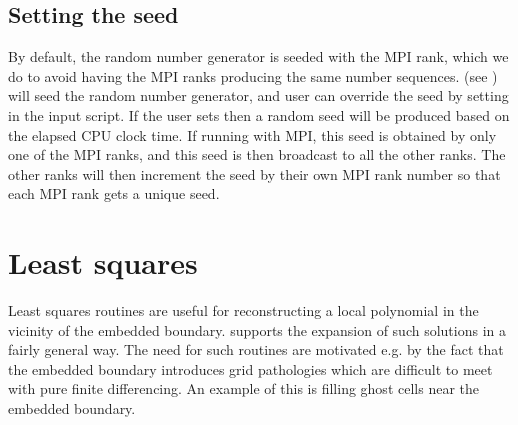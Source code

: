 \documentclass[letterpaper,10pt,english]{sphinxmanual}
\begin{document}
\subsection{Setting the seed}
\label{\detokenize{Utilities/RandomNumbers:setting-the-seed}}
\sphinxAtStartPar
By default, the random number generator is seeded with the MPI rank, which we do to avoid having the MPI ranks producing the same number sequences.
 (see {\hyperref[\detokenize{Source/Driver:chap-driver}]{}}) will seed the random number generator, and user can override the seed by setting  in the input script.
If the user sets  then a random seed will be produced based on the elapsed CPU clock time.
If running with MPI, this seed is obtained by only one of the MPI ranks, and this seed is then broadcast to all the other ranks.
The other ranks will then increment the seed by their own MPI rank number so that each MPI rank gets a unique seed.

\sphinxstepscope


\section{Least squares}
\label{\detokenize{Utilities/LeastSquares:least-squares}}\label{\detokenize{Utilities/LeastSquares:chap-leastsquares}}\label{\detokenize{Utilities/LeastSquares::doc}}
\sphinxAtStartPar
Least squares routines are useful for reconstructing a local polynomial in the vicinity of the embedded boundary.
 supports the expansion of such solutions in a fairly general way.
The need for such routines are motivated e.g. by the fact that the embedded boundary introduces grid pathologies which are difficult to meet with pure finite differencing.
An example of this is filling ghost cells near the embedded boundary.
\end{document}
